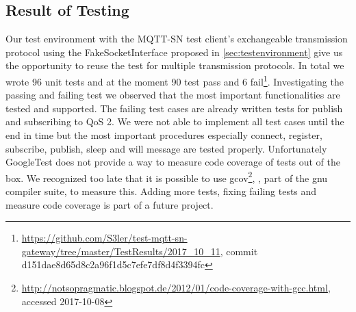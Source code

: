 \subsection{Result of Testing}
Our test environment with the MQTT-SN test client's exchangeable transmission protocol using the FakeSocketInterface proposed in \autoref{sec:testenvironment} give us the opportunity to reuse the test for multiple transmission protocols.
In total we wrote 96 unit tests and at the moment 90 test pass and 6 fail\footnote{\url{https://github.com/S3ler/test-mqtt-sn-gateway/tree/master/TestResults/2017_10_11}, commit d151dae8d65d8c2a96f1d5c7efe7df8d4f3394fc}.
Investigating the passing and failing test we observed that the most important functionalities are tested and supported.
The failing test cases are already written tests for publish and subscribing to QoS 2.
We were not able to implement all test cases until the end in time but the most important procedures especially connect, register, subscribe, publish, sleep and will message are tested properly.
Unfortunately GoogleTest does not provide a way to measure code coverage of tests out of the box.
We recognized too late that it is possible to use gcov\footnote{\url{http://notsopragmatic.blogspot.de/2012/01/code-coverage-with-gcc.html}, accessed 2017-10-08}, , part of the gnu compiler suite, to measure this.
Adding more tests, fixing failing tests and measure code coverage is part of a future project.